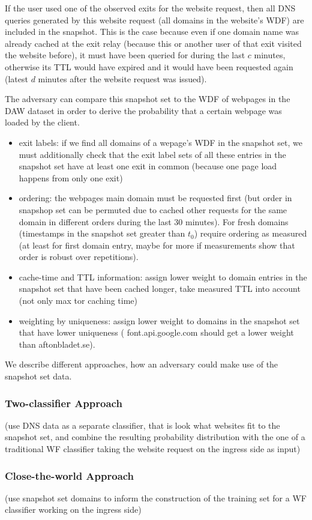 If the user used one of the observed exits for the website request, then
all DNS queries generated by this website request (\ie all domains in
the website's WDF) are included in the snapshot. This is the case
because even if one domain name was already cached at the exit relay
(because this or another user of that exit visited the website before),
it must have been queried for during the last $c$ minutes, otherwise its
TTL would have expired and it would have been requested again (latest
$d$ minutes after the website request was issued).

The adversary can compare this snapshot set to the WDF of webpages in
the DAW dataset in order to derive the probability that a certain
webpage was loaded by the client. 

\begin{itemize}
  \item exit labels: if we find all domains of a wepage's WDF in the
		  snapshot set, we must additionally check that the exit label
		  sets of all these entries in the snapshot set have at least
		  one exit in common (because one page load happens from only
		  one exit)
  \item ordering: the webpages main domain must be requested first (but
		  order in snapshop set can be permuted due to cached other
		  requests for the same domain in different orders during the
		  last 30 minutes). For fresh domains (timestamps in the
		  snapshot set greater than $t_0$) require ordering as measured
		  (at least for first domain entry, maybe for more if
		  measurements show that order is robust over repetitions).
  \item cache-time and TTL information: assign lower weight to domain
		  entries in the snapshot set that have been cached longer, take
		  measured TTL into account (not only max tor caching time) 
  \item weighting by uniqueness: assign lower weight to domains in the
		  snapshot set that have lower uniqueness (\eg
		  font.api.google.com should get a lower weight than
		  aftonbladet.se).
\end{itemize}

We describe different approaches, how an adversary could make use of the
snapshot set data.

\subsubsection{Two-classifier Approach}

(use DNS data as a separate classifier, that is look what websites fit
to the snapshot set, and combine the resulting probability distribution
with the one of a traditional WF classifier taking the website request
on the ingress side as input)


\subsubsection{Close-the-world Approach}
(use snapshot set domains to inform the construction of the training set
for a WF classifier working on the ingress side)
